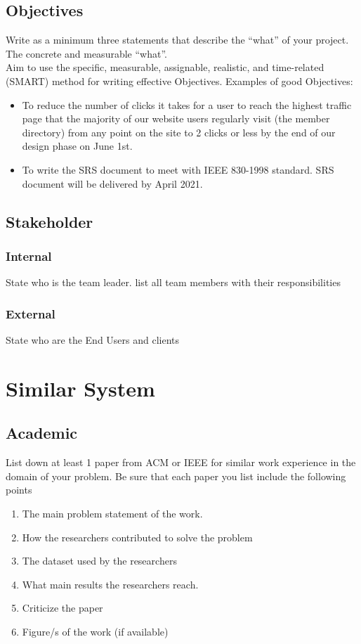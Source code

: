 \documentclass[hidelinks,a4paper,12pt]{article}
\begin{document}
\subsection{Objectives}
Write as a minimum three statements that describe the “what” of your project. \\The concrete and measurable “what”. 
\\Aim to use the specific, measurable, assignable, realistic, and time-related (SMART) method for writing effective Objectives.
Examples of good Objectives:
\begin{itemize}
\item To reduce the number of clicks it takes for a user to reach the highest traffic page that the majority of our website users regularly visit (the member directory) from any point on the site to 2 clicks or less by the end of our design phase on June 1st.
\item To write the SRS document to meet with IEEE 830-1998 standard. SRS document will be delivered by April 2021.
\end{itemize}

\subsection{Stakeholder}
\subsubsection{Internal}
State who is the team leader. list all team members with their responsibilities
\subsubsection{External}
State who are the End Users and clients

\section{Similar System}
\subsection{Academic}

List down at least 1 paper from ACM or IEEE for similar work experience in the domain of your problem. Be sure that each paper you list include the following points

\begin{enumerate}
\item The main problem statement of the work.
\item How the researchers contributed to solve the problem
\item The dataset used by the researchers
\item What main results the researchers reach.
\item Criticize the paper
\item Figure/s of the work (if available)
\end{enumerate}
\end{document}

